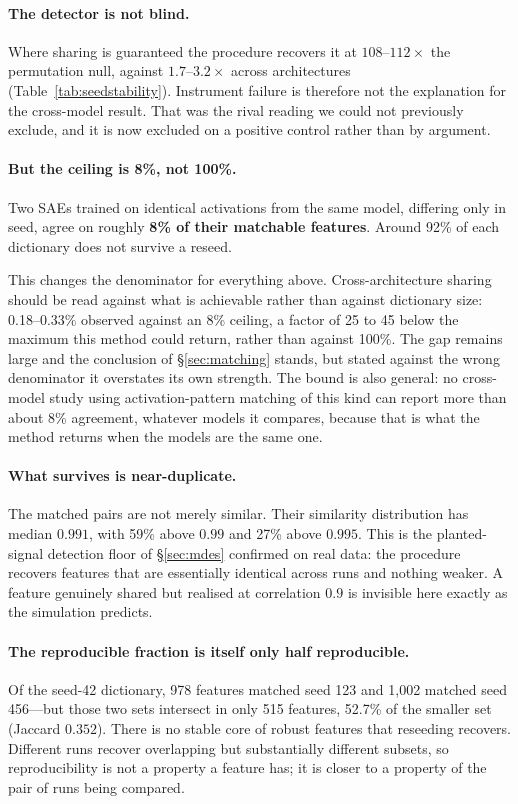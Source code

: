 \documentclass[11pt]{article}
\begin{document}
\paragraph{The detector is not blind.} Where sharing is guaranteed the procedure
recovers it at $108$--$112\times$ the permutation null, against $1.7$--$3.2\times$
across architectures (Table~\ref{tab:seedstability}). Instrument failure is therefore
not the explanation for the cross-model result. That was the rival reading we could not
previously exclude, and it is now excluded on a positive control rather than by
argument.

\paragraph{But the ceiling is 8\%, not 100\%.} Two SAEs trained on identical
activations from the same model, differing only in seed, agree on roughly \textbf{8\%
of their matchable features}. Around 92\% of each dictionary does not survive a reseed.

This changes the denominator for everything above. Cross-architecture sharing should be
read against what is achievable rather than against dictionary size: 0.18--0.33\%
observed against an 8\% ceiling, a factor of 25 to 45 below the maximum this method
could return, rather than against 100\%. The gap remains large and the conclusion of
\S\ref{sec:matching} stands, but stated against the wrong denominator it overstates its
own strength. The bound is also general: no cross-model study using activation-pattern
matching of this kind can report more than about 8\% agreement, whatever models it
compares, because that is what the method returns when the models are the same one.

\paragraph{What survives is near-duplicate.} The matched pairs are not merely similar.
Their similarity distribution has median $0.991$, with 59\% above $0.99$ and 27\% above
$0.995$. This is the planted-signal detection floor of \S\ref{sec:mdes} confirmed on real
data: the procedure recovers features that are essentially identical across runs and
nothing weaker. A feature genuinely shared but realised at correlation $0.9$ is invisible
here exactly as the simulation predicts.

\paragraph{The reproducible fraction is itself only half reproducible.} Of the seed-42
dictionary, 978 features matched seed 123 and 1{,}002 matched seed 456---but those two
sets intersect in only 515 features, 52.7\% of the smaller set (Jaccard $0.352$). There
is no stable core of robust features that reseeding recovers. Different runs recover
overlapping but substantially different subsets, so reproducibility is not a property a
feature has; it is closer to a property of the pair of runs being compared.
\end{document}
